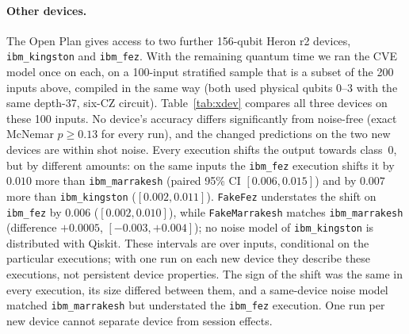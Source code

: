 \documentclass[11pt]{article}
\begin{document}
{\sloppy\paragraph{Other devices.} The Open Plan gives access to two further 156-qubit Heron r2 devices, \texttt{ibm\_kingston} and \texttt{ibm\_fez}. With the remaining quantum time we ran the CVE model once on each, on a 100-input stratified sample that is a subset of the 200 inputs above, compiled in the same way (both used physical qubits 0--3 with the same depth-37, six-CZ circuit). Table~\ref{tab:xdev} compares all three devices on these 100 inputs. No device's accuracy differs significantly from noise-free (exact McNemar $p \ge 0.13$ for every run), and the changed predictions on the two new devices are within shot noise. Every execution shifts the output towards class~0, but by different amounts: on the same inputs the \texttt{ibm\_fez} execution shifts it by $0.010$ more than \texttt{ibm\_marrakesh} (paired 95\% CI $[0.006, 0.015]$) and by $0.007$ more than \texttt{ibm\_kingston} ($[0.002, 0.011]$). \texttt{FakeFez} understates the shift on \texttt{ibm\_fez} by $0.006$ ($[0.002, 0.010]$), while \texttt{FakeMarrakesh} matches \texttt{ibm\_marrakesh} (difference $+0.0005$, $[-0.003, +0.004]$); no noise model of \texttt{ibm\_kingston} is distributed with Qiskit. These intervals are over inputs, conditional on the particular executions; with one run on each new device they describe these executions, not persistent device properties. The sign of the shift was the same in every execution, its size differed between them, and a same-device noise model matched \texttt{ibm\_marrakesh} but understated the \texttt{ibm\_fez} execution. One run per new device cannot separate device from session effects.\par}

\begin{table}[h]
\centering
\small
{}
\caption{Cross-device replication of the CVE classifier on 100 identical inputs (a subset of Table~\ref{tab:hw}'s inputs); \texttt{ibm\_marrakesh} rows are its three runs restricted to these inputs. $p = P(\text{changed} \ge \text{observed})$ under shot noise alone.}
\label{tab:xdev}
\end{table}
\end{document}
